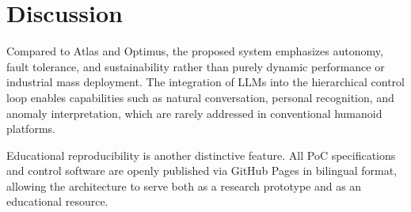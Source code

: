 \section{Discussion}
Compared to Atlas and Optimus, the proposed system emphasizes autonomy,
fault tolerance, and sustainability rather than purely dynamic performance
or industrial mass deployment.
The integration of LLMs into the hierarchical control loop
enables capabilities such as natural conversation,
personal recognition, and anomaly interpretation,
which are rarely addressed in conventional humanoid platforms.

Educational reproducibility is another distinctive feature.
All PoC specifications and control software are openly published
via GitHub Pages in bilingual format,
allowing the architecture to serve both as a research prototype
and as an educational resource.
